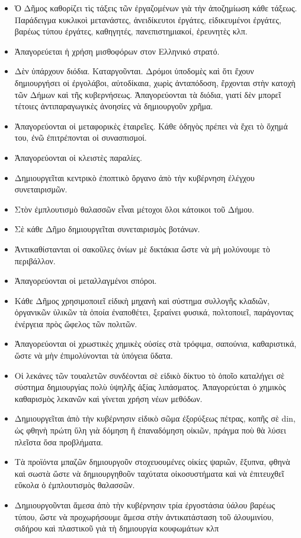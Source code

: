 \documentclass[a4paper]{article}
\begin{document}
\begin{itemize}
\item Ὁ Δῆμος καθορίζει τὶς τάξεις τῶν ἐργαζομένων γιὰ τὴν ἀποζημίωση κάθε τάξεως. Παράδειγμα κυκλικοὶ μετανάστες, ἀνειδίκευτοι ἐργάτες, εἰδικευμένοι ἐργάτες, βαρέως τύπου ἐργάτες, καθηγητές, πανεπιστημιακοί, ἐρευνητὲς κλπ.
\item Ἀπαγορεύεται ἡ χρήση μισθοφόρων στον Ελληνικό στρατό.
\item Δὲν ὑπάρχουν διόδια. Καταργοῦνται. Δρόμοι ὑποδομὲς καὶ ὅτι ἔχουν δημιουργήσει οἱ ἐργολάβοι, αὐτοδίκαια, χωρὶς ἀνταπόδοση, ἔρχονται στὴν κατοχὴ τῶν Δήμων καὶ τῆς κυβερνήσεως. Ἀπαγορεύονται τὰ διόδια, γιατί δὲν μπορεῖ τέτοιες ἀντιπαραγωγικὲς ἀνοησίες νὰ δημιουργοῦν χρῆμα.
\item Ἀπαγορεύονται οἱ μεταφορικὲς ἑταιρεῖες. Κάθε ὁδηγὸς πρέπει νὰ ἔχει τὸ ὄχημά του, ἐνῶ ἐπιτρέπονται οἱ συνασπισμοί.
\item Ἀπαγορεύονται οἱ κλειστὲς παραλίες.
\item Δημιουργεῖται κεντρικὸ ἐποπτικὸ ὄργανο ἀπὸ τὴν κυβέρνηση ἐλέγχου συνεταιρισμῶν.
\item Στὸν ἐμπλουτισμὸ θαλασσῶν εἶναι μέτοχοι ὅλοι κάτοικοι τοῦ Δήμου.
\item Σὲ κάθε Δῆμο δημιουργεῖται συνεταιρισμὸς βοτάνων.
\item Ἀντικαθίστανται οἱ σακοῦλες ὀνίων μὲ δικτάκια ὥστε νὰ μὴ μολύνουμε τὸ περιβάλλον.
\item Ἀπαγορεύονται οἱ μεταλλαγμένοι σπόροι.
\item Κάθε Δῆμος χρησιμοποιεῖ εἰδικὴ μηχανὴ καὶ σύστημα συλλογῆς κλαδιῶν, ὀργανικῶν ὑλικῶν τὰ ὁποία ἐναποθέτει, ξεραίνει φυσικά, πολτοποιεῖ, παράγοντας ἐνέργεια πρὸς ὤφελος τῶν πολιτῶν.
\item Ἀπαγορεύονται οἱ χρωστικὲς χημικὲς οὐσίες στὰ τρόφιμα, σαπούνια, καθαριστικά, ὥστε νὰ μὴν ἐπιμολύνονται τὰ ὑπόγεια ὕδατα.
\item Οἱ λεκάνες τῶν τουαλετῶν συνδέονται σὲ εἰδικὸ δίκτυο τὸ ὁποῖο καταλήγει σὲ σύστημα δημιουργίας πολὺ ὑψηλῆς ἀξίας λιπάσματος. Ἀπαγορεύεται ὁ χημικὸς καθαρισμὸς λεκανῶν καὶ γίνεται χρήση νέων μεθόδων.
\item Δημιουργεῖται ἀπὸ τὴν κυβέρνησιν εἰδικὸ σῶμα ἐξορύξεως πέτρας, κοπῆς σὲ din, ὡς φθηνὴ πρώτη ὕλη γιὰ δόμηση ἢ ἐπαναδόμηση οἰκιῶν, πράγμα ποὺ θὰ λύσει πλεῖστα ὅσα προβλήματα.
\item Τὰ προϊόντα μπαζῶν δημιουργοῦν στοχευουμένες οἰκίες ψαριῶν, ἔξυπνα, φθηνὰ καὶ σωστὰ ὥστε νὰ δημιουργηθοῦν ταχύτατα οἰκοσυστήματα καὶ νὰ ἐπιτευχθεῖ εὔκολα ὁ ἐμπλουτισμὸς θαλασσῶν.
\item Δημιουργοῦνται ἄμεσα ἀπὸ τὴν κυβέρνησιν τρία ἐργοστάσια ὑάλου βαρέως τύπου, ὥστε νὰ προχωρήσουμε ἄμεσα στὴν ἀντικατάσταση τοῦ ἀλουμινίου, σιδήρου καὶ πλαστικοῦ γιὰ τὴ δημιουργία κουφωμάτων κλπ

\end{itemize}
\end{document}

